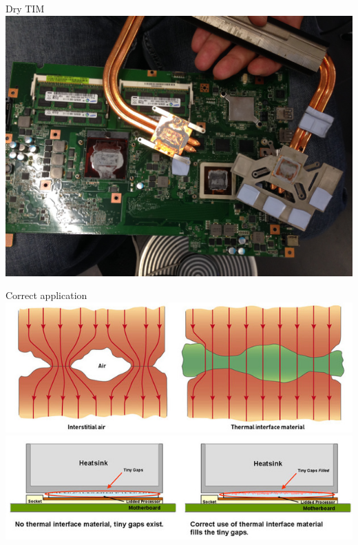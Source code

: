 \documentclass{beamer}
\begin{document}
\begin{frame}{Dry TIM}
    \centering
    \includegraphics[scale=0.075]{dry-tim}
\end{frame}

\begin{frame}{Correct application}
    \centering
    \includegraphics[scale=0.5]{tim-air}
    \newline
    \newline
    \includegraphics[scale=0.5]{heatsink-tim-cpu}
\end{frame}
\end{document}
